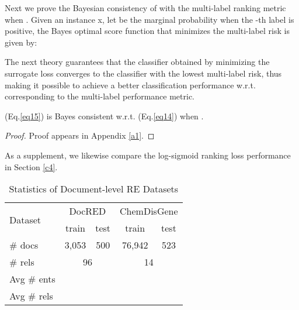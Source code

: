 \documentclass[11pt]{article}
\begin{document}
Next we prove the Bayesian consistency of  with the multi-label ranking metric  when . Given an instance x, let  be the marginal probability when the -th label is positive, the Bayes optimal score function  that minimizes the multi-label risk  is given by:


The next theory guarantees that the classifier obtained by minimizing the surrogate loss  converges to the classifier with the lowest multi-label risk, thus making it possible to achieve a better classification performance w.r.t. corresponding to the multi-label performance metric.

\begin{thm}\label{thm2}
 (Eq.\ref{eq15}) is Bayes consistent w.r.t.  (Eq.\ref{eq14}) when .
\end{thm} 
\begin{proof}
Proof appears in Appendix \ref{a1}.
\end{proof}

As a supplement, we likewise compare the log-sigmoid ranking loss performance in Section \ref{c4}.

\begin{table}
\centering
\begin{tabular}{lcccc}
\hline \multirow{2}{*}{ Dataset } & \multicolumn{2}{c}{DocRED} & \multicolumn{2}{c}{ChemDisGene} \\
 & train & test & train & test \\
\hline 
\# docs & 3,053 & 500 & 76,942 & 523 \\
\# rels & \multicolumn{2}{c}{96} & \multicolumn{2}{c}{14} \\
Avg \# ents &  &  &  &  \\
Avg \# rels &  &  &  &  \\
\hline
\end{tabular}
\caption{ Statistics of Document-level RE Datasets}
\label{tab:accents1}
\end{table}
\end{document}
